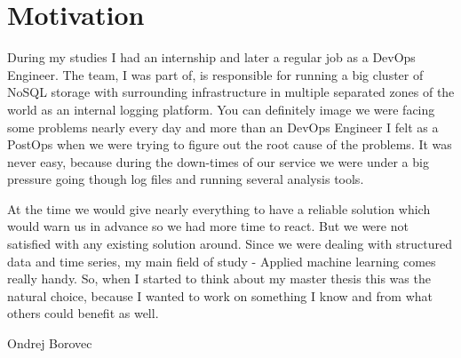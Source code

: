 \chapter*{Motivation}


During my studies I had an internship and later a regular job as a DevOps Engineer. The team, I was part of, is responsible for running a big cluster of NoSQL storage with surrounding infrastructure in multiple separated zones of the world as an internal logging platform. You can definitely image\ms{,} we were facing some problems nearly every day and more than an DevOps Engineer I felt as a PostOps when we were trying to figure out the root cause of the problems. It was never easy, because during the down-times of our service we were under a big pressure going though log files and running several analysis tools.

At the time we would give nearly everything to have a reliable solution which would warn us in advance so we had more time to react. But we were not satisfied with any existing solution around. Since we were dealing with structured data and time series, my main field of study - Applied machine learning comes really handy. So, when I started to think about my master thesis this was the natural choice, because I wanted to work on something I know and from what others could benefit as well.

\vspace{20mm}
\begin{flushright}
Ondrej Borovec
\end{flushright}